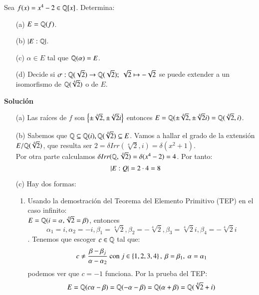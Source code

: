\begin{ex}
    Sea $f(x) = x^4 - 2 \in \mathbb{Q}[x]$. Determina:
    \begin{itemize}
        \item[(a)] $E=\mathbb{Q}(f)$.
        \item[(b)] $\left|E:\mathbb{Q}\right|$.
        \item[(c)] $\alpha \in E$ tal que $\mathbb{Q}(\alpha) = E$.
        \item[(d)] Decide si $\sigma: \mathbb{Q}(\sqrt 2) \to \mathbb{Q}(\sqrt 2);\ \sqrt{2} \mapsto -\sqrt{2}$ se puede extender a un isomorfismo de $\mathbb{Q}(\sqrt[4]{2})$ o de $E$.
    \end{itemize}

    \textbf{Solución}\\
    \begin{itemize}
        \item[(a)] Las raíces de $f$ son $\left\{\pm \sqrt[4]{2}, \pm \sqrt[4]{2}i\right\}$ entonces $E = \mathbb{Q}(\pm \sqrt[4]{2}, \pm \sqrt[4]{2}i) = \mathbb{Q}(\sqrt[4]{2}, i)$.
        \item[(b)] Sabemos que $\mathbb{Q} \subseteq \mathbb{Q}(i), \mathbb{Q}(\sqrt[4]{2}) \subseteq E$. Vamos a hallar el grado de la extensión $E/\mathbb{Q}(\sqrt[4]{2})$, que resulta ser $2 = \delta Irr(\sqrt[4]{2}, i) = \delta(x^2 + 1)$.\\
        Por otra parte calculamos $\delta Irr(\mathbb{Q}, \sqrt[4]{2}) = \delta(x^4-2) = 4$. Por tanto:
        $$
            \left|E:Q\right| = 2 \cdot 4 = 8
        $$
        \item[(c)] Hay dos formas:\\
            \begin{enumerate}
                \item Usando la demostración del Teorema del Elemento Primitivo (TEP) en el caso infinito:\\
                $E = \mathbb{Q}(i = \alpha, \sqrt[4]{2} = \beta)$, entonces $$\alpha_1 = i, \alpha_2 = -i, \beta_1 = \sqrt[4]{2}, \beta_2 = -\sqrt[4]{2}, \beta_3 = \sqrt[4]{2}i, \beta_4 = -\sqrt[4]{2}i$$.
                Tenemos que escoger $c \in \mathbb{Q}$ tal que:
                $$
                    c \neq \frac{\beta - \beta_j}{\alpha-\alpha_2} \text{ con } j \in \left\{1, 2, 3, 4\right\},\ \beta = \beta_1,\ \alpha = \alpha_1
                $$
                podemos ver que $c = -1$ funciona. Por la prueba del TEP: $$E = \mathbb{Q}(c\alpha - \beta) = \mathbb{Q}(-\alpha - \beta) = \mathbb{Q}(\alpha + \beta) = \mathbb{Q}(\sqrt[4]{2} + i)$$


\end{enumerate}
\end{itemize}
\end{ex}
